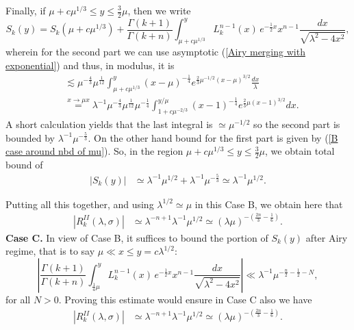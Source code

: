 \documentclass[11pt, reqno]{amsart}
\theoremstyle{plain}
\theoremstyle{remark}
\theoremstyle{example}
\theoremstyle{definition}
\numberwithin{equation}{section}
\begin{document}
Finally, if $\mu + c \mu^{1/3} \leq y \leq \frac{3}{2} \mu$, then we write
\begin{equation*}
    S_{k}(y) = S_{k}(\mu + c \mu^{1/3}) +    \frac{\Gamma(k+1)}{\Gamma(k+n)}  \int_{\mu + c \mu^{1/3}}^{y}  L_{k}^{n-1}(x) \, e^{-\frac{1}{2} x }  x^{n-1} \frac{dx}{\sqrt{\lambda^2 - 4 x^2}},
\end{equation*}
wherein for the second part we can use asymptotic (\ref{Airy merging with exponential}) and thus, in modulus,  it is 
\begin{equation*}
    \begin{split}
        & \lesssim \mu^{-\frac{4}{3}} \mu^{\frac{1}{12}} \int_{\mu + c \mu^{1/3}}^{y} (x-\mu)^{-\frac{1}{4}} e^{\frac{2}{3}  \mu^{-1/2} (x-\mu)^{3/2}  } \frac{dx}{\lambda}\\
        & \overset{x \rightarrow \mu x}{=} \lambda^{-1} \mu^{-\frac{4}{3}} \mu^{\frac{1}{12}} \mu^{-\frac{1}{4}} \int_{1 + c \mu^{-2/3}}^{y/ \mu} (x-1)^{-\frac{1}{4}} e^{\frac{2}{3}  \mu (x-1)^{3/2}  } dx.
    \end{split}
\end{equation*}
A short calculation yields that the last integral is $\simeq \mu^{-1/2}$ so the second part is bounded by $\lambda^{-1} \mu^{-\frac{5}{3}}$. On the other hand bound for the first part is given by (\ref{B case around nbd of mu}). So, in the region $\mu + c \mu^{1/3} \leq y \leq \frac{3}{2} \mu$, we obtain total bound of 
\begin{equation}\label{B case after nbd of mu}
    \begin{split}
        |S_{k}(y)| & \simeq  \lambda^{-1} \mu^{1/2} + \lambda^{-1} \mu^{- \frac{5}{3}} \simeq  \lambda^{-1} \mu^{1/2}.
    \end{split}
\end{equation}

Putting all this together, and using $\lambda^{1/2} \simeq \mu$ in this Case B, we obtain here that 
\begin{equation}
    \begin{split}
        |R_{k}^{II}(\lambda, \sigma)| & \simeq \lambda^{-n + 1}   \lambda^{-1} \mu^{1/2}  
        \simeq  (\lambda \mu )^{-\left( \frac{2n}{3} - \frac{1}{6}  \right)}.
    \end{split}
\end{equation}
\textbf{Case C.} In view of Case B, it suffices to bound the portion of  $S_{k}(y)$ after Airy regime, that is to say $\mu \ll x \leq y=c \lambda^{1/2} $:
\begin{equation*}
   \left|  \frac{\Gamma(k+1)}{\Gamma(k+n)}  \int_{ \frac{1}{a}\mu }^{y}  L_{k}^{n-1}(x) \, e^{-\frac{1}{2} x }  x^{n-1} \frac{dx}{\sqrt{\lambda^2 - 4 x^2}} \right| \ll \lambda^{-1} \mu^{- \frac{n}{2} - \frac{1}{2} - N },
\end{equation*}
for all $N>0$. Proving this estimate would ensure in Case C also we have
\begin{equation}
    \begin{split}
        |R_{k}^{II}(\lambda, \sigma)| & \simeq \lambda^{-n + 1}   \lambda^{-1} \mu^{1/2}  \simeq  (\lambda \mu )^{-\left( \frac{2n}{3} - \frac{1}{6}  \right)}.
    \end{split}
\end{equation}
\end{document}
